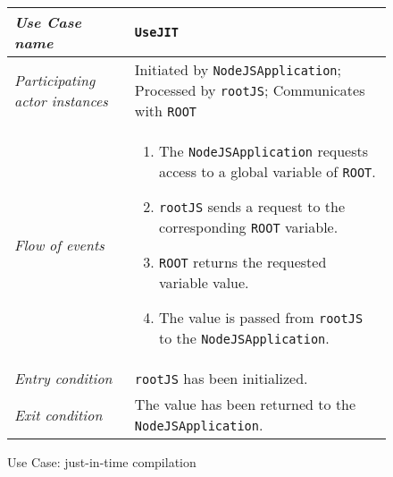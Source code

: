\begin{figure}[htb]
	\centering
	\begin{longtable}{p{3cm} @{\hskip 1cm} p{12cm}}
		\hline
		
		\textit{Use Case name} & \texttt{UseJIT}\\
		\hline
		
		\textit{Participating actor instances} & Initiated by \texttt{NodeJSApplication}; Processed by \texttt{rootJS}; Communicates with \texttt{ROOT}\\
		\hline
		
		\textit{Flow of events} &
		\begin{enumerate}
			\item The \texttt{NodeJSApplication} requests access to a global variable of \texttt{ROOT}.
			
			\item \texttt{rootJS} sends a request to the corresponding \texttt{ROOT} variable.
			
			\item \texttt{ROOT} returns the requested variable value.
			
			\item The value is passed from \texttt{rootJS} to the \texttt{NodeJSApplication}.
		\end{enumerate}
		\\
		\hline
		
		\textit{Entry condition} & \texttt{rootJS} has been initialized.\\
		\hline
		
		\textit{Exit condition} & The value has been returned to the \texttt{NodeJSApplication}.\\
		\hline
	\end{longtable}
	
	\caption{Use Case: just-in-time compilation}
\end{figure}